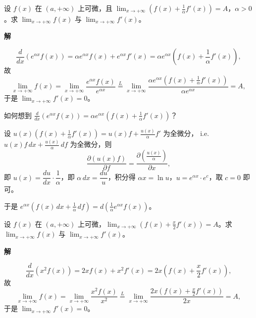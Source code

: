 \documentclass[lang=cn,chinesefont=founder,10pt]{elegantbook}
\renewenvironment{proof}[1][\proofname]{
  \par\noindent\textbf{\color{second}#1\;}\par\noindent
  \color{black!90}\cfs}{
  \par}
\begin{document}
\begin{example}
    设 $f(x)$ 在 $(a,+\infty)$ 上可微，且 $\displaystyle\lim_{x \to +\infty} \left(f(x)+\frac{1}{\alpha}f'(x)\right) = A$，$\alpha > 0$。求 $\displaystyle\lim_{x \to +\infty} f(x)$ 与 $\displaystyle\lim_{x \to +\infty} f'(x)$。
\end{example}

\begin{proof}[解]
    \[
        \frac{d}{dx}\left(e^{\alpha x}f(x)\right)
        = \alpha e^{\alpha x}f(x) + e^{\alpha x}f'(x)
        = \alpha e^{\alpha x}\left(f(x)+\frac{1}{\alpha}f'(x)\right),
    \]
    故
    \[
        \lim_{x \to +\infty} f(x)
        = \lim_{x \to +\infty} \frac{e^{\alpha x}f(x)}{e^{\alpha x}}
        \stackrel{L}{=} \lim_{x \to +\infty} \frac{\alpha e^{\alpha x}\left(f(x)+\frac{1}{\alpha}f'(x)\right)}{\alpha e^{\alpha x}}
        = A,
    \]
    于是 $\lim_{x \to +\infty} f'(x) = 0$。
\end{proof}

\begin{remark}
    如何想到 $\frac{d}{dx}(e^{\alpha x}f(x)) = \alpha e^{\alpha x}\left(f(x)+\frac{1}{\alpha}f'(x)\right)$？
    
    设 $u(x)\left(f(x)+\frac{1}{\alpha}f'(x)\right) = u(x)f + \frac{u(x)}{\alpha}f'$ 为全微分，
    i.e. $u(x)f\,dx + \frac{u(x)}{\alpha}\,df$ 为全微分，则
    \[
        \frac{\partial(u(x)f)}{\partial f} = \frac{\partial\left(\frac{u(x)}{\alpha}\right)}{\partial x},
    \]
    即 $u(x) = \dfrac{du}{dx}\cdot\dfrac{1}{\alpha}$，即 $\alpha\,dx = \dfrac{du}{u}$，积分得 $\alpha x = \ln u$，$u = e^{\alpha x}\cdot e^c$，取 $c = 0$ 即可。
    
    于是 $e^{\alpha x}\left(f(x)\,dx + \frac{1}{\alpha}\,df\right) = d\left(\frac{1}{\alpha}e^{\alpha x}f(x)\right)$。
\end{remark}

\begin{example}
    设 $f(x)$ 在 $(a,+\infty)$ 上可微，$\displaystyle\lim_{x \to +\infty}\left(f(x)+\frac{x}{2}f'(x)\right) = A$。求 $\displaystyle\lim_{x \to +\infty} f(x)$ 与 $\displaystyle\lim_{x \to +\infty} f'(x)$。
\end{example}

\begin{proof}[解]
    \[
        \frac{d}{dx}\left(x^2 f(x)\right)
        = 2x f(x) + x^2 f'(x)
        = 2x\left(f(x)+\frac{x}{2}f'(x)\right),
    \]
    故
    \[
        \lim_{x \to +\infty} f(x)
        = \lim_{x \to +\infty} \frac{x^2 f(x)}{x^2}
        \stackrel{L}{=} \lim_{x \to +\infty} \frac{2x\left(f(x)+\frac{x}{2}f'(x)\right)}{2x}
        = A,
    \]
    于是 $\lim_{x \to +\infty} f'(x) = 0$。
\end{proof}
\end{document}
